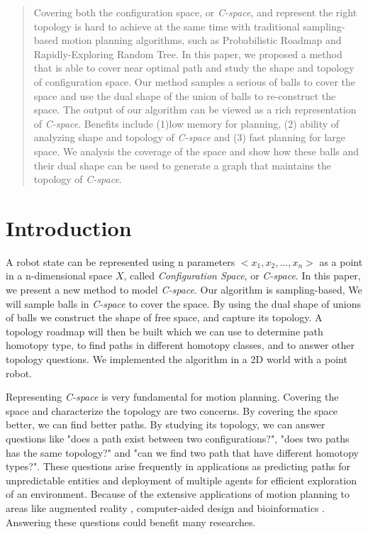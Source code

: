 \documentclass[11pt]{article}
\begin{document}
\maketitle

\begin{abstract}
Covering both the configuration space, or \emph{C-space}, and represent the right topology is hard to achieve at the same time with traditional sampling-based motion planning algorithms, such as Probabilistic Roadmap and Rapidly-Exploring Random Tree. In this paper, we proposed a method that is able to cover near optimal path and study the shape and topology of configuration space. Our method samples a serious of balls to cover the space and use the dual shape of the union of balls to re-construct the space. The output of our algorithm can be viewed as a rich representation of \emph{C-space}. Benefits include (1)low memory for planning, (2) ability of analyzing shape and topology of \emph{C-space} and (3) fast planning for large space. We analysis the coverage of the space and show how these balls and their dual shape can be used to generate a graph that maintains the topology of \emph{C-space}.
\end{abstract}

\section{Introduction}

\indent\indent A robot state can be represented using n parameters $<x_1, x_2, ..., x_n>$ as a point in a n-dimensional space $X$, called \emph{Configuration Space}, or \emph{C-space}\cite{UMAPRM}. In this paper, we present a new method to model \emph{C-space}. Our algorithm is sampling-based, We will sample balls in \emph{C-space} to cover the space. By using the dual shape of unions of balls we construct the shape of free space, and capture its topology. A topology roadmap will then be built which we can use to determine path homotopy type, to find paths in different homotopy classes, and to answer other topology questions. We implemented the algorithm in a 2D world with a point robot. 

\indent Representing \emph{C-space} is very fundamental for motion planning. Covering the space and characterize the topology are two concerns. By covering the space better, we can find better paths. By studying its topology, we can answer questions like "does a path exist between two configurations?", "does two paths has the same topology?" and "can we find two path that have different homotopy types?". These questions arise frequently in applications as predicting paths for unpredictable entities and deployment of multiple agents for efficient exploration of an environment\cite{pathtop}. Because of the extensive applications of motion planning to areas like augmented reality \cite{aug}, computer-aided design \cite{design} and bioinformatics \cite{bioinformatics}. Answering these questions could benefit many researches. 
\end{document}
